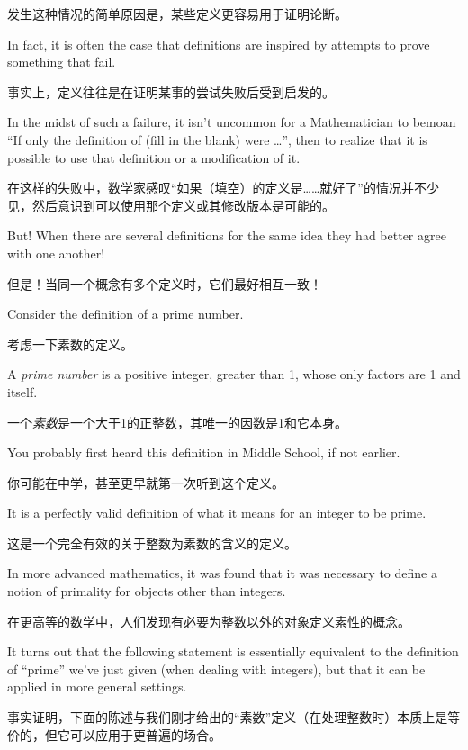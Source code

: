 发生这种情况的简单原因是，某些定义更容易用于证明论断。

In fact, it is often the case
that definitions are inspired by attempts to prove something that 
fail.

事实上，定义往往是在证明某事的尝试失败后受到启发的。

In the midst of such a failure, it isn't uncommon for a 
Mathematician to bemoan ``If only the definition of (fill in the 
blank) were \ldots'', then to realize that it is possible to
use that definition or a modification of it.

在这样的失败中，数学家感叹“如果（填空）的定义是……就好了”的情况并不少见，然后意识到可以使用那个定义或其修改版本是可能的。

But! When there are 
several definitions
for the same idea they had better agree with one another!

但是！当同一个概念有多个定义时，它们最好相互一致！

Consider the definition of a prime number. 

考虑一下素数的定义。

\begin{defi} 
A {\em prime number} is a positive integer,
greater than 1, whose only factors are 1 and itself.
\end{defi}

\begin{defi}
一个{\em 素数}是一个大于1的正整数，其唯一的因数是1和它本身。
\end{defi}

You probably first heard this definition in Middle School, if not
earlier.

你可能在中学，甚至更早就第一次听到这个定义。

It is a perfectly valid definition of what it means 
for an integer to be prime.

这是一个完全有效的关于整数为素数的含义的定义。

In more advanced mathematics, it
was found that it was necessary to define a notion of primality
for objects other than integers.

在更高等的数学中，人们发现有必要为整数以外的对象定义素性的概念。

It turns out that the following
statement is essentially equivalent to the definition of ``prime'' we've just
given (when dealing with integers), but that it can be applied in 
more general settings.

事实证明，下面的陈述与我们刚才给出的“素数”定义（在处理整数时）本质上是等价的，但它可以应用于更普遍的场合。

